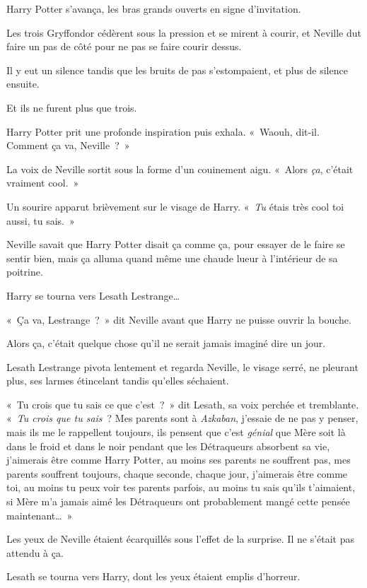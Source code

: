 Harry Potter s'avança, les bras grands ouverts en signe d'invitation.

Les trois Gryffondor cédèrent sous la pression et se mirent à courir, et Neville dut faire un pas de côté pour ne pas se faire courir dessus.

Il y eut un silence tandis que les bruits de pas s'estompaient, et plus de silence ensuite.

Et ils ne furent plus que trois.

Harry Potter prit une profonde inspiration puis exhala.
«~Waouh, dit-il.
Comment ça va, Neville~?~»

La voix de Neville sortit sous la forme d'un couinement aigu.
«~Alors \emph{ça}, c'était vraiment cool.~»

Un sourire apparut brièvement sur le visage de Harry.
«~\emph{Tu} étais très cool toi aussi, tu sais.~»

Neville savait que Harry Potter disait ça comme ça, pour essayer de le faire se sentir bien, mais ça alluma quand même une chaude lueur à l'intérieur de sa poitrine.

Harry se tourna vers Lesath Lestrange…

«~Ça va, Lestrange~?~»
dit Neville avant que Harry ne puisse ouvrir la bouche.

Alors ça, c'était quelque chose qu'il ne serait jamais imaginé dire un jour.

Lesath Lestrange pivota lentement et regarda Neville, le visage serré, ne pleurant plus, ses larmes étincelant tandis qu'elles séchaient.

«~Tu crois que tu sais ce que c'est~?~»
dit Lesath, sa voix perchée et tremblante.
«~\emph{Tu crois que tu sais}~?
Mes parents sont à \emph{Azkaban}, j'essaie de ne pas y penser, mais ils me le rappellent toujours, ils pensent que c'est \emph{génial} que Mère soit là dans le froid et dans le noir pendant que les Détraqueurs absorbent sa vie, j'aimerais être comme Harry Potter, au moins ses parents ne souffrent pas, mes parents souffrent toujours, chaque seconde, chaque jour, j'aimerais être comme toi, au moins tu peux voir tes parents parfois, au moins tu sais qu'ils t'aimaient, si Mère m'a jamais aimé les Détraqueurs ont probablement mangé cette pensée maintenant…~»

Les yeux de Neville étaient écarquillés sous l'effet de la surprise.
Il ne s'était pas attendu à ça.

Lesath se tourna vers Harry, dont les yeux étaient emplis d'horreur.

